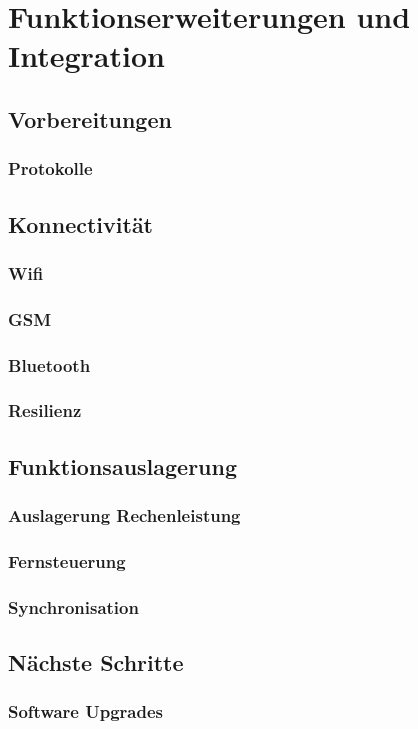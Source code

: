 \section{Funktionserweiterungen und Integration}

\subsection{Vorbereitungen}
\subsubsection{Protokolle}

\subsection{Konnectivität}
\subsubsection{Wifi}
\subsubsection{GSM}
\subsubsection{Bluetooth}
\subsubsection{Resilienz}


\subsection{Funktionsauslagerung}
\subsubsection{Auslagerung Rechenleistung}
\subsubsection{Fernsteuerung}
\subsubsection{Synchronisation}

\subsection{Nächste Schritte}
\subsubsection{Software Upgrades}